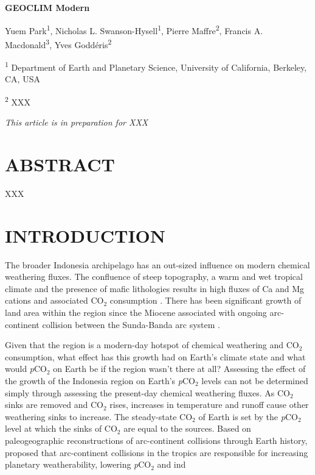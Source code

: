 \documentclass[11pt,letterpaper]{article}
\newcommand{\pCOtwo}{\textit{p}CO$_{2}$\xspace}
\newcommand{\COtwo}{CO$_{2}$\xspace}
\begin{document}
\begin{flushleft}
{\Large \textbf{GEOCLIM Modern}}

Yuem Park\textsuperscript{1},
Nicholas L. Swanson-Hysell\textsuperscript{1},
Pierre Maffre\textsuperscript{2},
Francis A. Macdonald\textsuperscript{3},
Yves Godd\'eris\textsuperscript{2}

\bigskip
\textsuperscript{1} Department of Earth and Planetary Science, University of California, Berkeley, CA, USA

\textsuperscript{2} XXX
\bigskip

\end{flushleft}

\noindent\textit{This article is in preparation for XXX}

\linenumbers

\section*{ABSTRACT \label{sec:ABSTRACT}}

XXX

\section*{INTRODUCTION \label{sec:INTRODUCTION}}

The broader Indonesia archipelago has an out-sized influence on modern chemical weathering fluxes. The confluence of steep topography, a warm and wet tropical climate and the presence of mafic lithologies results in high fluxes of Ca and Mg cations and associated \COtwo consumption \citep{Hartmann2009a,Hartmann2014a}. There has been significant growth of land area within the region since the Miocene associated with ongoing arc-continent collision between the Sunda-Banda arc system \citep{Molnar2015a}.

Given that the region is a modern-day hotspot of chemical weathering and \COtwo consumption, what effect has this growth had on Earth's climate state and what would \pCOtwo on Earth be if the region wasn't there at all? Assessing the effect of the growth of the Indonesia region on Earth's \pCOtwo levels can not be determined simply through assessing the present-day chemical weathering fluxes. As \COtwo sinks are removed and \COtwo rises, increases in temperature and runoff cause other weathering sinks to increase. The steady-state \COtwo of Earth is set by the \pCOtwo level at which the sinks of \COtwo are equal to the sources. Based on paleogeographic reconstructions of arc-continent collisions through Earth history, \citet{Macdonald2019a} proposed that arc-continent collisions in the tropics are responsible for increasing planetary weatherability, lowering \pCOtwo and ind
\end{document}
